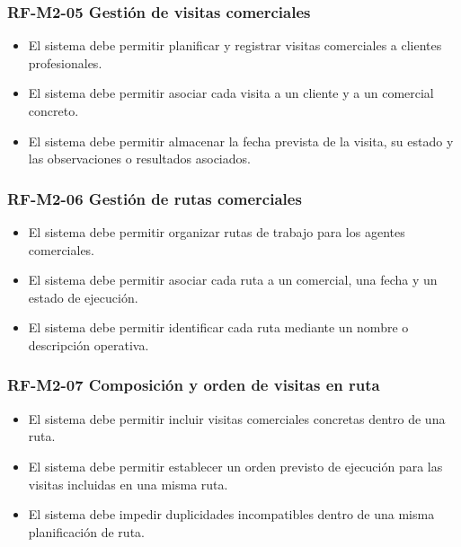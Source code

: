 \vspace{-0.75em}
\subsubsection{RF-M2-05 Gestión de visitas comerciales}
\vspace{-1em}

\begin{itemize}
    \item El sistema debe permitir planificar y registrar visitas comerciales a clientes profesionales.
    \item El sistema debe permitir asociar cada visita a un cliente y a un comercial concreto.
    \item El sistema debe permitir almacenar la fecha prevista de la visita, su estado y las observaciones o resultados asociados.
\end{itemize}

\vspace{-0.75em}
\subsubsection{RF-M2-06 Gestión de rutas comerciales}
\vspace{-1em}

\begin{itemize}
    \item El sistema debe permitir organizar rutas de trabajo para los agentes comerciales.
    \item El sistema debe permitir asociar cada ruta a un comercial, una fecha y un estado de ejecución.
    \item El sistema debe permitir identificar cada ruta mediante un nombre o descripción operativa.
\end{itemize}

\vspace{-0.75em}
\subsubsection{RF-M2-07 Composición y orden de visitas en ruta}
\vspace{-1em}

\begin{itemize}
    \item El sistema debe permitir incluir visitas comerciales concretas dentro de una ruta.
    \item El sistema debe permitir establecer un orden previsto de ejecución para las visitas incluidas en una misma ruta.
    \item El sistema debe impedir duplicidades incompatibles dentro de una misma planificación de ruta.
\end{itemize}

